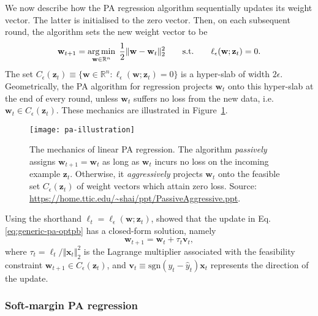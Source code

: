 We now describe how the PA regression algorithm sequentially updates its weight vector. The latter is initialised to the zero vector. Then, on each subsequent round, the algorithm sets the new weight vector to be
\begin{equation}
\label{eq:generic-pa-optpb}
	\mathbf{w}_{t+1} = \operatorname*{arg\,min}_{\mathbf{w} \in \mathbb{R}^n} \; \frac{1}{2}\Vert\mathbf{w} - \mathbf{w}_t\Vert_2^2
	\qquad \text{s.t.} \qquad \ell_{\epsilon}(\mathbf{w}; \mathbf{z}_t) = 0.
\end{equation}
The set $C_{\epsilon}(\mathbf{z}_t) \equiv \{\mathbf{w} \in \mathbb{R}^n : \ell_{\epsilon}(\mathbf{w}; \mathbf{z}_t) = 0\}$ is a hyper-slab of width $2\epsilon$. Geometrically, the PA algorithm for regression projects $\mathbf{w}_t$ onto this hyper-slab at the end of every round, unless $\mathbf{w}_t$ suffers no loss from the new data, i.e.\ $\mathbf{w}_t \in C_{\epsilon}(\mathbf{z}_t)$. These mechanics are illustrated in Figure~\ref{fig:pa-illustration}.
\begin{figure}[t]
	\texttt{[image: pa-illustration]}
	\caption{The mechanics of linear PA regression. The algorithm \emph{passively} assigns $\mathbf{w}_{t+1} = \mathbf{w}_t$ as long as $\mathbf{w}_t$ incurs no loss on the incoming example $\mathbf{z}_t$. Otherwise, it \emph{aggressively} projects $\mathbf{w}_t$ onto the feasible set $C_{\epsilon}(\mathbf{z}_t)$ of weight vectors which attain zero loss. Source: \url{https://home.ttic.edu/~shai/ppt/PassiveAggressive.ppt}.}
	\label{fig:pa-illustration}
\end{figure}

Using the shorthand $\ell_t = \ell_{\epsilon}(\mathbf{w}; \mathbf{z}_t)$, \citet{crammer06} showed that the update in Eq. \eqref{eq:generic-pa-optpb} has a closed-form solution, namely
\begin{equation}
\label{eq:generic-pa-update-rule}
	\mathbf{w}_{t+1}
	= \mathbf{w}_t + \tau_t\mathbf{v}_t,
\end{equation}
where $\tau_t = \ell_t / \Vert\mathbf{x}_t\Vert_2^2$ is the Lagrange multiplier associated with the feasibility constraint $\mathbf{w}_{t+1} \in C_{\epsilon}(\mathbf{z}_t)$, and $\mathbf{v}_t \equiv \mathrm{sgn}(y_t - \hat{y}_t)\mathbf{x}_t$ represents the direction of the update.

\subsubsection{Soft-margin PA regression}


